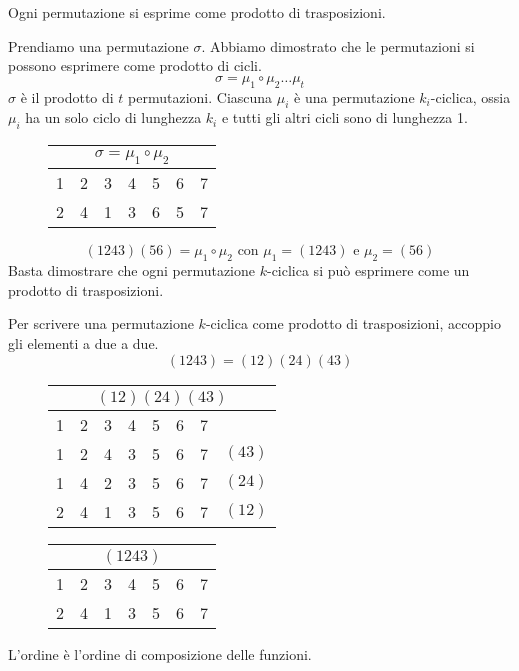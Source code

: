 \begin{prop}
Ogni permutazione si esprime come prodotto di trasposizioni.
\end{prop}
Prendiamo una permutazione $\sigma$. Abbiamo dimostrato che le permutazioni si possono esprimere come prodotto di cicli.
\[
\sigma = \mu_1 \circ \mu_2 \ldots \mu_t
\]
$\sigma$ \`e il prodotto di $t$ permutazioni. Ciascuna $\mu_i$ \`e una permutazione $k_i$-ciclica, ossia $\mu_i$ ha un solo ciclo di lunghezza $k_i$ e tutti gli altri cicli sono di lunghezza 1.
\begin{figure}[ht]
\centering
\begin{tabular}{*{7}{c}}
\multicolumn{7}{c}{$\sigma = \mu_1 \circ \mu_2$} \\
\hline
\cellcolor{green!20} 1 & \cellcolor{green!20} 2 & \cellcolor{green!20} 3 & \cellcolor{green!20} 4 & \cellcolor{blue!20} 5 & \cellcolor{blue!20} 6 & 7 \\
\cellcolor{green!20} 2 & \cellcolor{green!20} 4 & \cellcolor{green!20} 1 & \cellcolor{green!20} 3 & \cellcolor{blue!20} 6 & \cellcolor{blue!20} 5 & 7
\end{tabular}
\end{figure}
\[
(1 2 4 3) (5 6) = \mu_1 \circ \mu_2 \text{ con } \mu_1 = (1 2 4 3) \text{ e } \mu_2 = (5 6)
\]
Basta dimostrare che ogni permutazione $k$-ciclica si pu\`o esprimere come un prodotto di trasposizioni.

Per scrivere una permutazione $k$-ciclica come prodotto di trasposizioni, accoppio gli elementi a due a due.
\[
(1 2 4 3) = (1 2) (2 4) (4 3)
\]
\begin{figure}[ht]
\centering
\begin{tabular}{*{8}{c}}
\multicolumn{8}{c}{$(1 2) (2 4) (4 3)$} \\
\hline
1 & 2 & 3 & 4 & 5 & 6 & 7 & \\
1 & 2 & \cellcolor{green!20} 4 & \cellcolor{green!20} 3 & 5 & 6 & 7 & $(4 3)$ \\
1 & \cellcolor{green!20} 4 & \cellcolor{green!20} 2 & \cellcolor{green!5} 3 & 5 & 6 & 7 & $(2 4)$ \\
\cellcolor{green!20} 2 & \cellcolor{green!5} 4 & \cellcolor{green!20} 1 & \cellcolor{green!5} 3 & 5 & 6 & 7 & $(1 2)$
\end{tabular}
\qquad
\begin{tabular}{*{7}{c}}
\multicolumn{7}{c}{$(1 2 4 3)$} \\
\hline
1 & 2 & 3 & 4 & 5 & 6 & 7 \\
\cellcolor{green!20} 2 & \cellcolor{green!20} 4 & \cellcolor{green!20} 1 & \cellcolor{green!20} 3 & 5 & 6 & 7 
\end{tabular}
\end{figure}
L'ordine \`e l'ordine di composizione delle funzioni.

